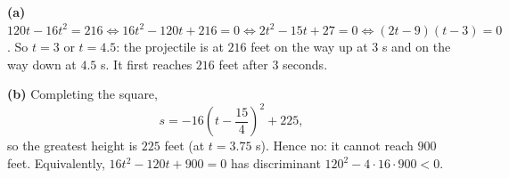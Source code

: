 \textbf{(a)} $120t-16t^2=216\iff 16t^2-120t+216=0\iff 2t^2-15t+27=0\iff(2t-9)(t-3)=0$. So $t=3$ or $t=4.5$: the projectile is at $216$ feet on the way up at $3$ s and on the way down at $4.5$ s. It first reaches $216$ feet after $\boxed{3}$ seconds.

\textbf{(b)} Completing the square,
\[
s=-16\left(t-\dfrac{15}{4}\right)^2+225,
\]
so the greatest height is $225$ feet (at $t=3.75$ s). Hence $\boxed{\text{no}}$: it cannot reach $900$ feet. Equivalently, $16t^2-120t+900=0$ has discriminant $120^2-4\cdot16\cdot900<0$.
